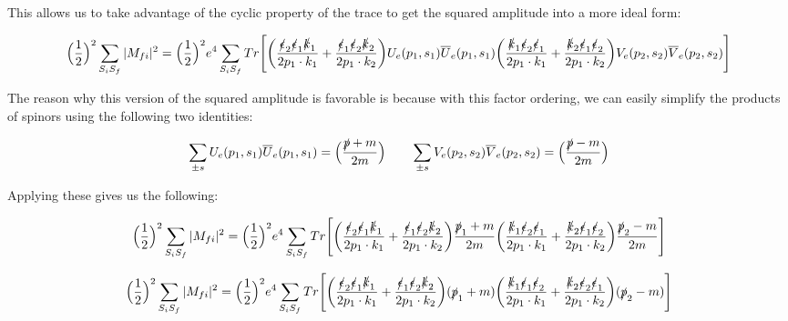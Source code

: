 \documentclass[a4]{article}
\begin{document}
    This allows us to take advantage of the cyclic property of the trace to get the squared amplitude into a more ideal form:

    \begin{equation}
        \Big( \frac{1}{2} \Big)^2 \sum_{S_i S_f} |M_{fi}|^2 = \Big( \frac{1}{2} \Big)^2 e^4 \sum_{S_i S_f} Tr \Bigg[ \bigg( \frac{\slashed{\epsilon}_2 \slashed{\epsilon}_1 \slashed{k}_1}{2 p_1 \cdot k_1} + \frac{\slashed{\epsilon}_1 \slashed{\epsilon}_2 \slashed{k}_2}{2 p_1 \cdot k_2} \bigg) U_e (p_1, s_1) \overline{U}_e (p_1, s_1) \bigg( \frac{\slashed{k}_1 \slashed{\epsilon}_2 \slashed{\epsilon}_1}{2 p_1 \cdot k_1}  + \frac{\slashed{k}_2 \slashed{\epsilon}_1 \slashed{\epsilon}_2}{2 p_1 \cdot k_2} \bigg) V_e (p_2, s_2) \overline{V}_e (p_2, s_2) \Bigg]
    \end{equation}

    The reason why this version of the squared amplitude is favorable is because with this factor ordering, we can easily simplify the products of spinors using the following two identities:

    \begin{equation}
        \sum_{\pm s} U_e (p_1, s_1) \overline{U}_e (p_1, s_1) = \Big( \frac{\slashed{p} + m}{2m} \Big) \qquad \sum_{\pm s} V_e (p_2, s_2) \overline{V}_e (p_2, s_2) = \Big( \frac{\slashed{p} - m}{2m} \Big)
    \end{equation}

    Applying these gives us the following:

    \begin{equation}
        \Big( \frac{1}{2} \Big)^2 \sum_{S_i S_f} |M_{fi}|^2 = \Big( \frac{1}{2} \Big)^2 e^4 \sum_{S_i S_f} Tr \Bigg[ \bigg( \frac{\slashed{\epsilon}_2 \slashed{\epsilon}_1 \slashed{k}_1}{2 p_1 \cdot k_1}  + \frac{\slashed{\epsilon}_1 \slashed{\epsilon}_2 \slashed{k}_2}{2 p_1 \cdot k_2} \bigg) \frac{\slashed{p}_1 + m}{2m} \bigg( \frac{\slashed{k}_1 \slashed{\epsilon}_2 \slashed{\epsilon}_1}{2 p_1 \cdot k_1}  + \frac{\slashed{k}_2 \slashed{\epsilon}_1 \slashed{\epsilon}_2}{2 p_1 \cdot k_2} \bigg) \frac{\slashed{p}_2 - m}{2m} \Bigg]
    \end{equation}

    \begin{equation}
        \Big( \frac{1}{2} \Big)^2 \sum_{S_i S_f} |M_{fi}|^2 = \Big( \frac{1}{2} \Big)^2 e^4 \sum_{S_i S_f} Tr \Bigg[ \bigg( \frac{\slashed{\epsilon}_2 \slashed{\epsilon}_1 \slashed{k}_1}{2 p_1 \cdot k_1}  + \frac{\slashed{\epsilon}_1 \slashed{\epsilon}_2 \slashed{k}_2}{2 p_1 \cdot k_2} \bigg) (\slashed{p}_1 + m) \bigg( \frac{\slashed{k}_1 \slashed{\epsilon}_1 \slashed{\epsilon}_2}{2 p_1 \cdot k_1}  + \frac{\slashed{k}_2 \slashed{\epsilon}_2 \slashed{\epsilon}_1}{2 p_1 \cdot k_2} \bigg) (\slashed{p}_2 - m) \Bigg]
    \end{equation}
\end{document}
